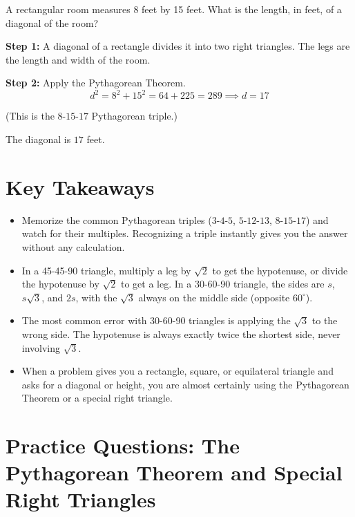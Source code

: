 \documentclass[14pt]{extarticle}
\begin{document}
A rectangular room measures 8 feet by 15 feet. What is the length, in feet, of a diagonal of the room?

\textbf{Step 1:} A diagonal of a rectangle divides it into two right triangles. The legs are the length and width of the room.

\textbf{Step 2:} Apply the Pythagorean Theorem.
\[
d^2 = 8^2 + 15^2 = 64 + 225 = 289 \implies d = 17
\]

(This is the \(8\text{-}15\text{-}17\) Pythagorean triple.)

The diagonal is \(\boxed{17}\) feet.

\section*{Key Takeaways}
\begin{itemize}
  \item Memorize the common Pythagorean triples (\(3\text{-}4\text{-}5\), \(5\text{-}12\text{-}13\), \(8\text{-}15\text{-}17\)) and watch for their multiples. Recognizing a triple instantly gives you the answer without any calculation.
  \item In a 45-45-90 triangle, multiply a leg by \(\sqrt{2}\) to get the hypotenuse, or divide the hypotenuse by \(\sqrt{2}\) to get a leg. In a 30-60-90 triangle, the sides are \(s\), \(s\sqrt{3}\), and \(2s\), with the \(\sqrt{3}\) always on the middle side (opposite \(60^\circ\)).
  \item The most common error with 30-60-90 triangles is applying the \(\sqrt{3}\) to the wrong side. The hypotenuse is always exactly twice the shortest side, never involving \(\sqrt{3}\).
  \item When a problem gives you a rectangle, square, or equilateral triangle and asks for a diagonal or height, you are almost certainly using the Pythagorean Theorem or a special right triangle.
\end{itemize}

\newpage

\section*{Practice Questions: The Pythagorean Theorem and Special Right Triangles}
\end{document}
